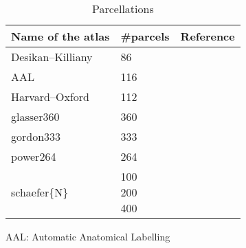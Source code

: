 \renewcommand\cellset{\renewcommand\arraystretch{0.5}%
    \setlength\extrarowheight{0pt}}
\begin{table}[bt]
    \begin{threeparttable}
        \begin{subtable}[t]{.75\textwidth}
            \label{tab:parcellations2}
            \begin{tabularx}{\textwidth}{l l l}
                \toprule
                \textbf{Name of the atlas}  & \textbf{\#parcels}                                  & \textbf{Reference}          \\
                \midrule
                Desikan--Killiany           & \num{86}                                            & \cite{desikan2006automated} \\
                AAL                         & \num{116}                                           & \cite{tzourio2002automated} \\
                Harvard--Oxford             & \num{112}                                           & \cite{makris2006decreased}  \\
                glasser360                  & \num{360}                                           & \cite{Glasser2016-ia}       \\
                gordon333                   & \num{333}                                           & \cite{Gordon2016-wy}        \\
                power264                    & \num{264}                                           & \cite{Power2011-xf}         \\
                schaefer\{N\}               & \makecell[lt]{\num{100} \\ \num{200}\\ \num{400}}   & \cite{Schaefer2018-bo}      \\
                \bottomrule
            \end{tabularx}
            \begin{tablenotes}
                \item{AAL:} Automatic Anatomical Labelling
            \end{tablenotes}
            \caption{Parcellations}
        \end{subtable}
        \qquad
        \begin{subtable}[t]{.75\textwidth}
            \label{tab:parcellations}

\end{subtable}
\end{threeparttable}
\end{table}
